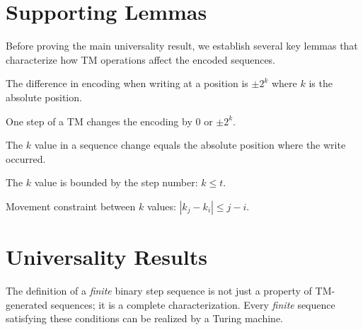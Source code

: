 \chapter{Supporting Lemmas}

Before proving the main universality result, we establish several key lemmas that characterize how TM operations affect the encoded sequences.

\begin{lemma}
\label{lem:encode_diff_at_write}
\notready
{}
The difference in encoding when writing at a position is $\pm 2^k$ where $k$ is the absolute position.
\end{lemma}

\begin{lemma}
\label{lem:sequence_diff_is_power_of_two}
\notready
{}
One step of a TM changes the encoding by $0$ or $\pm 2^k$.
\end{lemma}

\begin{lemma}
\label{lem:sequence_k_equals_position}
\notready
{}
The $k$ value in a sequence change equals the absolute position where the write occurred.
\end{lemma}

\begin{lemma}
\label{lem:sequence_k_bound}
\notready
{}
The $k$ value is bounded by the step number: $k \leq t$.
\end{lemma}

\begin{lemma}
\label{lem:sequence_k_movement_constraint}
\notready
{}
Movement constraint between $k$ values: $|k_j - k_i| \leq j - i$.
\end{lemma}

\chapter{Universality Results}

The definition of a \emph{finite} binary step sequence is not just a property of TM-generated sequences; it is a complete characterization. Every \emph{finite} sequence satisfying these conditions can be realized by a Turing machine.

